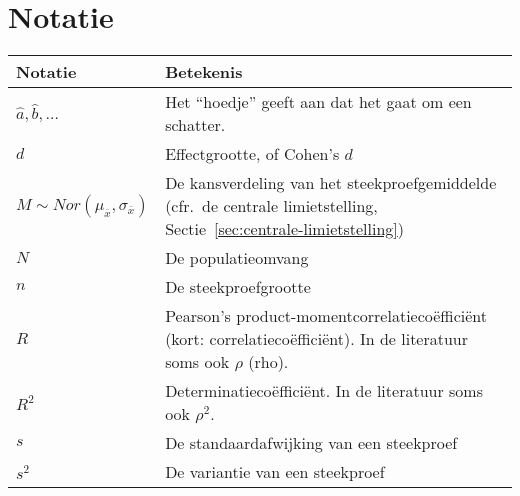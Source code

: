 \chapter{Notatie}
\label{app:notatie}

\begin{table}
  \centering
  \begin{tabular}{p{}p{}}
  	\toprule
  	\textbf{Notatie}                                        & \textbf{Betekenis}                                                                                                                     \\
  	\midrule
  	$\widehat{a}, \widehat{b}, \ldots$                      & Het ``hoedje'' geeft aan dat het gaat om een schatter.                                                                                 \\
    $d$                                                     & Effectgrootte, of Cohen's $d$ \\
  	$M \sim Nor(\mu_{\overline{x}}, \sigma_{\overline{x}})$ & De kansverdeling van het steekproefgemiddelde (cfr.~de centrale limietstelling, Sectie~\ref{sec:centrale-limietstelling})              \\
  	$N$                                                     & De populatieomvang                                                                                                                     \\
  	$n$                                                     & De steekproefgrootte                                                                                                                   \\
  	$R$                                                     & Pearson's product-momentcorrelatiecoëfficiënt (kort: correlatiecoëfficiënt). In de literatuur soms ook $\rho$ (rho).                         \\
  	$R^2$                                                   & Determinatiecoëfficiënt. In de literatuur soms ook $\rho^2$.                                                                           \\
  	$s$                                                     & De standaardafwijking van een steekproef                                                                                                \\
  	$s^2$                                                   & De variantie van een steekproef                                                                                                         \\

\end{tabular}
\end{table}
